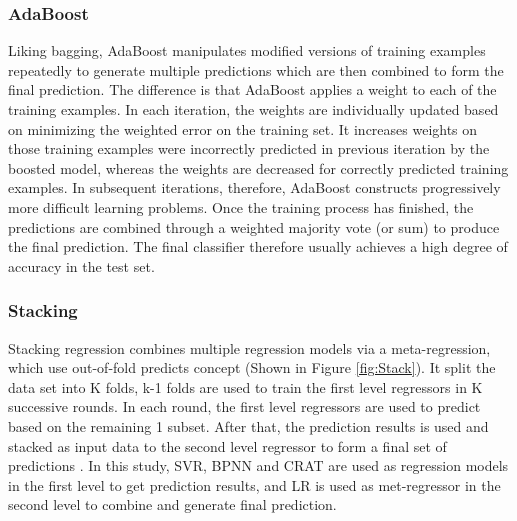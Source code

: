 \documentclass[11pt]{article}
\begin{document}
	
	\subsubsection{AdaBoost}
	
	Liking bagging, AdaBoost \cite{freund1996experiments} manipulates modified versions of training examples repeatedly to generate multiple predictions which are then combined to form the final prediction. The difference is that AdaBoost applies a weight to each of the training examples. In each iteration, the weights are individually updated based on minimizing the weighted error on the training set. It increases weights on those training examples were incorrectly predicted in previous iteration by the boosted model, whereas the weights are decreased for correctly predicted training examples. In subsequent iterations, therefore, AdaBoost constructs progressively more difficult learning problems.  Once the training process has finished, the predictions are combined through a weighted majority vote (or sum) to produce the final prediction. The final classifier therefore usually achieves a high degree of accuracy in the test set.
	
	\subsubsection{Stacking}
	
	Stacking regression combines multiple regression models via a meta-regression, which use out-of-fold predicts concept \cite{raschkas_2018_mlxtend} (Shown in Figure \ref{fig:Stack}). It split the data set into K folds, k-1 folds are used to train the first level regressors in K successive rounds. In each round, the first level regressors are used to predict based on the remaining 1 subset. After that, the prediction results is used and stacked as input data to the second level regressor to form a final set of predictions \cite{sill2009feature}. In this study, SVR, BPNN and CRAT are used as regression models in the first level to get prediction results, and LR is used as met-regressor in the second level to combine and generate final prediction. 
	
\end{document}
